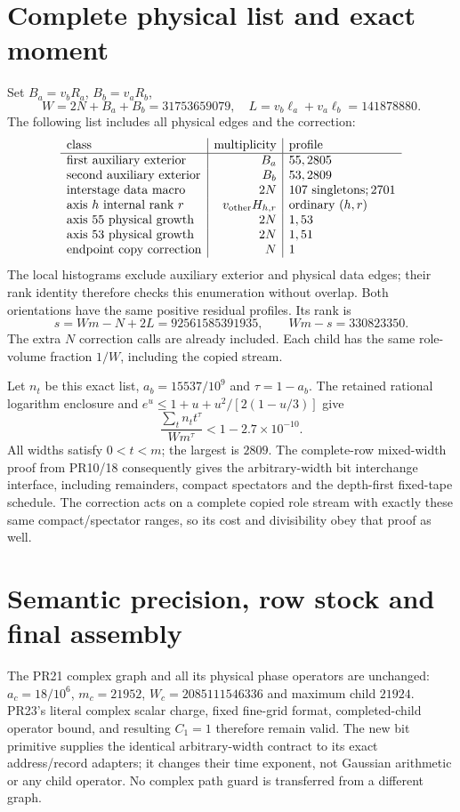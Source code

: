 \documentclass[11pt]{article}
\begin{document}
\section{Complete physical list and exact moment}
Set $B_a=v_bR_a$, $B_b=v_aR_b$,
\[
 W=2N+B_a+B_b=31753659079,\quad
 L=v_b\ell_a+v_a\ell_b=141878880.
\]
The following list includes all physical edges and the correction:
\[
\begin{array}{l|r|l}
\text{class}&\text{multiplicity}&\text{profile}\\\hline
\text{first auxiliary exterior}&B_a&55,2805\\
\text{second auxiliary exterior}&B_b&53,2809\\
\text{interstage data macro}&2N&107\text{ singletons};2701\\
\text{axis }h\text{ internal rank }r&v_{\rm other}H_{h,r}&\text{ordinary }(h,r)\\
\text{axis }55\text{ physical growth}&2N&1,53\\
\text{axis }53\text{ physical growth}&2N&1,51\\
\text{endpoint copy correction}&N&1
\end{array}
\]
The local histograms exclude auxiliary exterior and physical data edges;
their rank identity therefore checks this enumeration without overlap.
Both orientations have the same positive residual profiles. Its rank is
\[
 s=Wm-N+2L=92561585391935,\qquad Wm-s=330823350.
\]
The extra $N$ correction calls are already included. Each child has the
same role-volume fraction $1/W$, including the copied stream.

Let $n_t$ be this exact list, $a_b=15537/10^9$ and $\tau=1-a_b$.
The retained rational logarithm enclosure and
$e^u\le1+u+u^2/[2(1-u/3)]$ give
\[
 \frac{\sum_t n_t t^\tau}{Wm^\tau}
 <1-2.7\times10^{-10}.
\]
All widths satisfy $0<t<m$; the largest is $2809$.
The complete-row mixed-width proof from PR10/18 consequently gives the
arbitrary-width bit interchange interface, including remainders, compact
spectators and the depth-first fixed-tape schedule. The correction acts on
a complete copied role stream with exactly these same compact/spectator
ranges, so its cost and divisibility obey that proof as well.

\section{Semantic precision, row stock and final assembly}
The PR21 complex graph and all its physical phase operators are unchanged:
$a_c=18/10^6$, $m_c=21952$, $W_c=2085111546336$ and maximum child $21924$.
PR23's literal complex scalar charge, fixed fine-grid format, completed-child
operator bound, and resulting $C_1=1$ therefore remain valid. The new bit
primitive supplies the identical arbitrary-width contract to its exact
address/record adapters; it changes their time exponent, not Gaussian
arithmetic or any child operator. No complex path guard is transferred
from a different graph.
\end{document}
